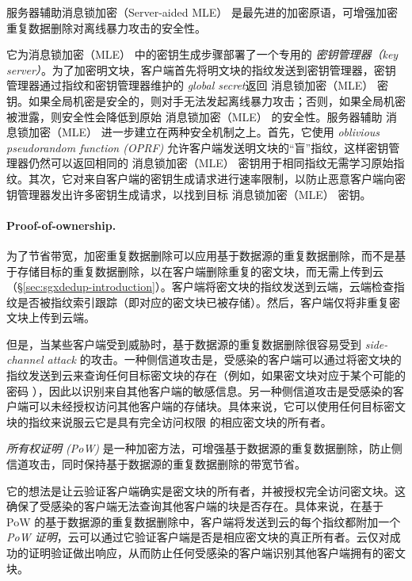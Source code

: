 服务器辅助消息锁加密（Server-aided MLE）\cite{bellare13b} 是最先进的加密原语，可增强加密重复数据删除对离线暴力攻击的安全性。

它为消息锁加密（MLE） 中的密钥生成步骤部署了一个专用的 \textit{ 密钥管理器（key server）}。为了加密明文块，客户端首先将明文块的指纹发送到密钥管理器，密钥管理器通过指纹和密钥管理器维护的\textit{ global secret}返回 消息锁加密（MLE） 密钥。如果全局机密是安全的，则对手无法发起离线暴力攻击；否则，如果全局机密被泄露，则安全性会降低到原始 消息锁加密（MLE） 的安全性。服务器辅助 消息锁加密（MLE） 进一步建立在两种安全机制之上。首先，它使用 \textit{ oblivious pseudorandom function (OPRF)} \cite{naor04} 允许客户端发送明文块的“盲”指纹，这样密钥管理器仍然可以返回相同的 消息锁加密（MLE） 密钥用于相同指纹无需学习原始指纹。其次，它对来自客户端的密钥生成请求进行速率限制，以防止恶意客户端向密钥管理器发出许多密钥生成请求，以找到目标 消息锁加密（MLE） 密钥。

\paragraph*{Proof-of-ownership.} 为了节省带宽，加密重复数据删除可以应用基于数据源的重复数据删除，而不是基于存储目标的重复数据删除，以在客户端删除重复的密文块，而无需上传到云（\S\ref{sec:sgxdedup-introduction}）。客户端将密文块的指纹发送到云端，云端检查指纹是否被指纹索引跟踪（即对应的密文块已被存储）。然后，客户端仅将非重复密文块上传到云端。


但是，当某些客户端受到威胁时，基于数据源的重复数据删除很容易受到 \textit{ side-channel attack} \cite{harnik10,halevi11} 的攻击。一种侧信道攻击是，受感染的客户端可以通过将密文块的指纹发送到云来查询任何目标密文块的存在（例如，如果密文块对应于某个可能的密码 \cite{harnik10}），因此以识别来自其​​他客户端的敏感信息。另一种侧信道攻击是受感染的客户端可以未经授权访问其他客户端的存储块。具体来说，它可以使用任何目标密文块的指纹来说服云它是具有完全访问权限 \cite{halevi11} 的相应密文块的所有者。


\textit{ 所有权证明 (PoW)} \cite{halevi11} 是一种加密方法，可增强基于数据源的重复数据删除，防止侧信道攻击，同时保持基于数据源的重复数据删除的带宽节省。

它的想法是让云验证客户端确实是密文块的所有者，并被授权完全访问密文块。这确保了受感染的客户端无法查询其他客户端的块是否存在。具体来说，在基于 PoW 的基于数据源的重复数据删除中，客户端将发送到云的每个指纹都附加一个 \textit{ PoW 证明}，云可以通过它验证客户端是否是相应密文块的真正所有者。云仅对成功的证明验证做出响应，从而防止任何受感染的客户端识别其他客户端拥有的密文块。 

